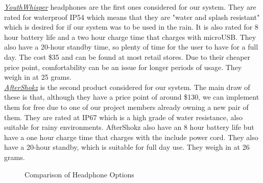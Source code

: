 \noindent \underline{\textit{YouthWhisper}} headphones are the first ones considered for our system. They are rated for waterproof IP54 which means that they are "water and splash resistant" which is desired for if our system was to be used in the rain. It is also rated for 8 hour battery life  and a two hour charge time that charges with microUSB. They also have a 20-hour standby time, so plenty of time for the user to have for a full day. The cost \$35 and can be found at most retail stores. Due to their cheaper price point, comfortability can be an issue for longer periods of usage. They weigh in at 25 grams. \\

\noindent \underline{\textit{AfterShokz}} is the second product considered for our system. The main draw of these is that, although they have a price point of around \$130, we can implement them for free due to one of our project members already owning a new pair of them. They are rated at IP67 which is a high grade of water resistance, also suitable for rainy environments. AfterShokz also have an 8 hour battery life but have a one hour charge time that charges with the include power cord. They also have a 20-hour standby, which is suitable for full day use. They weigh in at 26 grams. \\

\begin{figure}[H]
	\centering
	\setlength{\tabcolsep}{5pt} %
	\renewcommand{\arraystretch}{1.75} %
	\caption{\label{fig:headphonesComparison}Comparison of Headphone Options}
\end{figure}


